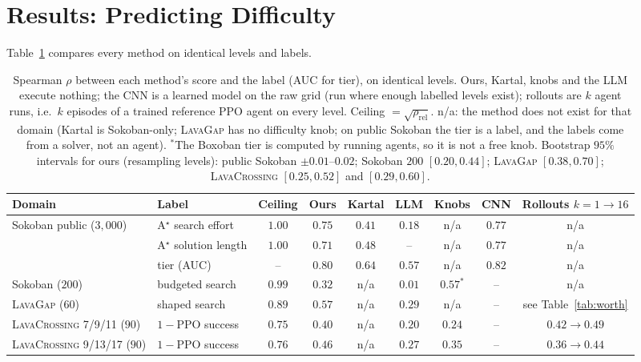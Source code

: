 \documentclass[twoside]{article}
\begin{document}
\section{Results: Predicting Difficulty}
\label{sec:results}
\label{sec:results-prediction}
\label{sec:results-sokoban}

Table~\ref{tab:prediction} compares every method on identical levels and labels.

\begin{table}[t]
\centering
\small
\caption{Spearman $\rho$ between each method's score and the label (AUC for tier), on identical levels. Ours, Kartal, knobs and the LLM execute nothing; the CNN is a learned model on the raw grid (run where enough labelled levels exist); rollouts are $k$ agent runs, i.e.\ $k$ episodes of a trained reference PPO agent on every level. Ceiling $=\sqrt{\rho_{\mathrm{rel}}}$. n/a: the method does not exist for that domain (Kartal is Sokoban-only; \textsc{LavaGap} has no difficulty knob; on public Sokoban the tier is a label, and the labels come from a solver, not an agent). $^\ast$The Boxoban tier is computed by running agents, so it is not a free knob. Bootstrap $95\%$ intervals for ours (resampling levels): public Sokoban $\pm0.01$--$0.02$; Sokoban $200$ $[0.20, 0.44]$; \textsc{LavaGap} $[0.38, 0.70]$; \textsc{LavaCrossing} $[0.25, 0.52]$ and $[0.29, 0.60]$.}
\label{tab:prediction}
\setlength{\tabcolsep}{5pt}
\begin{tabular}{llccccccc}
\toprule
Domain & Label & Ceiling & \textbf{Ours} & Kartal & LLM & Knobs & CNN & Rollouts $k{=}1 \to 16$ \\
\midrule
Sokoban public ($3{,}000$) & A$^\star$ search effort & $1.00$ & $\mathbf{0.75}$ & $0.41$ & $0.18$ & n/a & $0.77$ & n/a \\
 & A$^\star$ solution length & $1.00$ & $0.71$ & $0.48$ & -- & n/a & $0.77$ & n/a \\
 & tier (AUC) & -- & $0.80$ & $0.64$ & $0.57$ & n/a & $0.82$ & n/a \\
Sokoban ($200$) & budgeted search & $0.99$ & $0.32$ & n/a & $0.01$ & $0.57^\ast$ & -- & n/a \\
\textsc{LavaGap} ($60$) & shaped search & $0.89$ & $\mathbf{0.57}$ & n/a & $0.29$ & n/a & -- & see Table~\ref{tab:worth} \\
\textsc{LavaCrossing} 7/9/11 ($90$) & $1-$PPO success & $0.75$ & $0.40$ & n/a & $0.20$ & $0.24$ & -- & $0.42 \to 0.49$ \\
\textsc{LavaCrossing} 9/13/17 ($90$) & $1-$PPO success & $0.76$ & $\mathbf{0.46}$ & n/a & $0.27$ & $0.35$ & -- & $0.36 \to 0.44$ \\
\bottomrule
\end{tabular}
\end{table}
\end{document}
